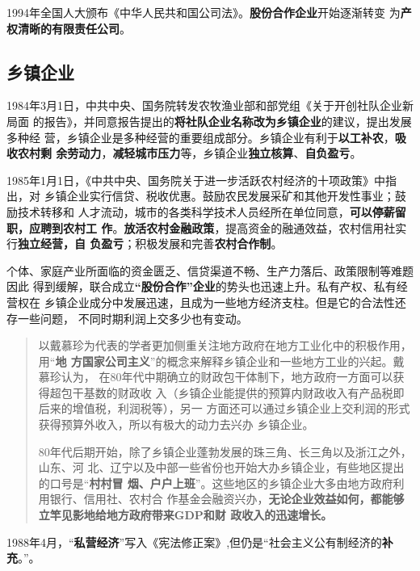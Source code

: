 1994年全国人大颁布《中华人民共和国公司法》。\textbf{股份合作企业}开始逐渐转变
为\textbf{产权清晰的有限责任公司}。

\subsection{乡镇企业}




1984年3月1日，中共中央、国务院转发农牧渔业部和部党组《关于开创社队企业新局面
的报告》，并同意报告提出的\textbf{将社队企业名称改为乡镇企业}的建议，提出发展多种经
营，乡镇企业是多种经营的重要组成部分。乡镇企业有利于\textbf{以工补农}，\textbf{吸收农村剩
  余劳动力}，\textbf{减轻城市压力}等，乡镇企业\textbf{独立核算}、\textbf{自负盈亏}。

1985年1月1日，《中共中央、国务院关于进一步活跃农村经济的十项政策》中指出，对
乡镇企业实行信贷、税收优惠。鼓励农民发展采矿和其他开发性事业；鼓励技术转移和
人才流动，城市的各类科学技术人员经所在单位同意，\textbf{可以停薪留职，应聘到农村工
  作}。\textbf{放活农村金融政策}，提高资金的融通效益，农村信用社实行\textbf{独立经营，自
  负盈亏}；积极发展和完善\textbf{农村合作制}。

个体、家庭产业所面临的资金匮乏、信贷渠道不畅、生产力落后、政策限制等难题因此
得到缓解，联合成立\textbf{“股份合作”企业}的势头也迅速上升。私有产权、私有经营权在
乡镇企业成分中发展迅速，且成为一些地方经济支柱。但是它的合法性还存一些问题，
不同时期利润上交多少也有变动。

\begin{quotation}
  以戴慕珍为代表的学者更加侧重关注地方政府在地方工业化中的积极作用，用“\textbf{地
    方国家公司主义}”的概念来解释乡镇企业和一些地方工业的兴起。戴慕珍认为，
  在80年代中期确立的财政包干体制下，地方政府一方面可以获得超包干基数的财政收
  入（乡镇企业能提供的预算内财政收入有产品税即后来的增值税，利润税等），另一
  方面还可以通过乡镇企业上交利润的形式获得预算外收入，所以有极大的动力去兴办
  乡镇企业。

  80年代后期开始，除了乡镇企业蓬勃发展的珠三角、长三角以及浙江之外，山东、河
  北、辽宁以及中部一些省份也开始大办乡镇企业，有些地区提出的口号是“\textbf{村村冒
    烟、户户上班}”。这些地区的乡镇企业大多由地方政府利用银行、信用社、农村合
  作基金会融资兴办，\textbf{无论企业效益如何，都能够立竿见影地给地方政府带来GDP和财
    政收入的迅速增长。}
\end{quotation}

1988年4月，“\textbf{私营经济}”写入《宪法修正案》,但仍是“社会主义公有制经济的\textbf{补
充}。”。

